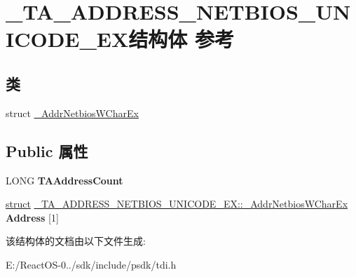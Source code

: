\hypertarget{struct___t_a___a_d_d_r_e_s_s___n_e_t_b_i_o_s___u_n_i_c_o_d_e___e_x}{}\section{\+\_\+\+T\+A\+\_\+\+A\+D\+D\+R\+E\+S\+S\+\_\+\+N\+E\+T\+B\+I\+O\+S\+\_\+\+U\+N\+I\+C\+O\+D\+E\+\_\+\+E\+X结构体 参考}
\label{struct___t_a___a_d_d_r_e_s_s___n_e_t_b_i_o_s___u_n_i_c_o_d_e___e_x}
\subsection*{类}
\begin{DoxyCompactItemize}
\item 
struct \hyperlink{struct___t_a___a_d_d_r_e_s_s___n_e_t_b_i_o_s___u_n_i_c_o_d_e___e_x_1_1___addr_netbios_w_char_ex}{\+\_\+\+Addr\+Netbios\+W\+Char\+Ex}
\end{DoxyCompactItemize}
\subsection*{Public 属性}
\begin{DoxyCompactItemize}
\item 
\mbox{\label{struct___t_a___a_d_d_r_e_s_s___n_e_t_b_i_o_s___u_n_i_c_o_d_e___e_x_a4b6f572c14af93a3673a0fc5ef41fcc9}} 
L\+O\+NG {\bfseries T\+A\+Address\+Count}
\item 
\mbox{\label{struct___t_a___a_d_d_r_e_s_s___n_e_t_b_i_o_s___u_n_i_c_o_d_e___e_x_a3aed8611b616fe93fa9a5a7034214406}} 
\hyperlink{interfacestruct}{struct} \hyperlink{struct___t_a___a_d_d_r_e_s_s___n_e_t_b_i_o_s___u_n_i_c_o_d_e___e_x_1_1___addr_netbios_w_char_ex}{\+\_\+\+T\+A\+\_\+\+A\+D\+D\+R\+E\+S\+S\+\_\+\+N\+E\+T\+B\+I\+O\+S\+\_\+\+U\+N\+I\+C\+O\+D\+E\+\_\+\+E\+X\+::\+\_\+\+Addr\+Netbios\+W\+Char\+Ex} {\bfseries Address} \mbox{[}1\mbox{]}
\end{DoxyCompactItemize}


该结构体的文档由以下文件生成\+:\begin{DoxyCompactItemize}
\item 
E\+:/\+React\+O\+S-\/0../sdk/include/psdk/tdi.\+h\end{DoxyCompactItemize}
